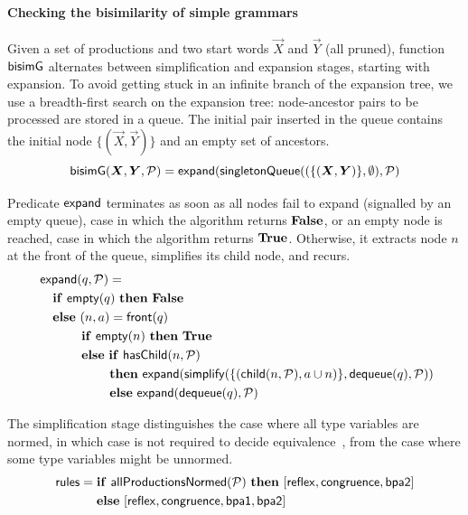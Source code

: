 \paragraph{Checking the bisimilarity of simple grammars}

Given a set of productions and two start words $\vec X$ and $\vec Y$
(all pruned), function $\mathsf{bisimG}$ alternates between simplification and
expansion stages, starting with expansion.
%
To avoid getting stuck in an infinite branch of the expansion tree, we
use a breadth-first search on the expansion tree: node-ancestor pairs
to be processed are stored in a queue. The initial pair inserted in the queue
contains the
initial node $\{(\vec X,\vec Y)\}$ and an empty set of ancestors.
%
\begin{equation*}
  \Bisim(\vec X, \vec Y, \productions) = \expand(
  \mathsf{singletonQueue}((\{(\vec X,\vec Y)\},\emptyset),  
  \productions)
\end{equation*}

Predicate $\mathsf{expand}$ terminates as soon as all nodes fail to expand
(signalled by an empty queue), case in which the algorithm returns
$\mathbf{False}$, or an empty node is reached, case in which the algorithm
returns $\mathbf{True}$.  Otherwise, it extracts node $n$ at the front of the
queue, simplifies its child node, and recurs.
%
\begin{align*}
  &\mathsf{expand}(q, \mathcal P) =\\
  &\quad \mathbf{if}\ \mathsf{empty}(q)\ \mathbf{then}\ \mathbf{False}\\
  &\quad \mathbf{else}\ (n,a) = \mathsf{front}(q)\\
  & \qquad\quad\; \mathbf{if}\ \mathsf{empty}(n)\ \mathbf{then}\ \mathbf{True}\\
  & \qquad\quad\; \mathbf{else}\ \mathbf{if}\ \mathsf{hasChild}(n, \mathcal P)\\\
  & \qquad\qquad\quad\; \: \mathbf{then}\
    \mathsf{expand}(\mathsf{simplify}(
    \{(\mathsf{child}(n, \mathcal P), a \cup n)\}, \mathsf{dequeue}(q), \mathcal P))\\
  & \qquad\qquad\quad\;\: \mathbf{else}\ \mathsf{expand}(\mathsf{dequeue}(q), \mathcal P)
\end{align*}

The simplification stage distinguishes the case where all type
variables are normed, in which case  is not required to decide
equivalence~\cite{caucal1986decidabilite,DBLP:journals/iandc/ChristensenHS95},
from the case where some type variables might be unnormed.
%
\begin{align*}
  \mathsf{rules} =\;& \If\ \mathsf{allProductionsNormed(\productions)}\ \Then\
  [\mathsf{reflex} ,\mathsf{congruence}, \mathsf{bpa2}]\\
  &\Else\ [\mathsf{reflex} ,\mathsf{congruence}, \mathsf{bpa1} , \mathsf{bpa2}]
\end{align*}


